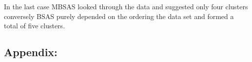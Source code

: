 \documentclass[a4paper]{article}
\begin{document}
	\noindent In the last case MBSAS looked through the data and suggested only four clusters conversely BSAS purely depended on the ordering the data set and formed a total of five clusters.

\newpage
\subsection*{Appendix:}
	
	
	
	
	
	
\end{document}
